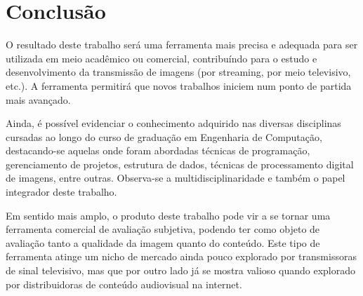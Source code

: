 \chapter{Conclusão}

O resultado deste trabalho será uma ferramenta mais precisa e adequada para ser utilizada em meio acadêmico ou comercial, contribuíndo para o estudo e desenvolvimento da transmissão de imagens (por streaming, por meio televisivo, etc.). A ferramenta permitirá que novos trabalhos iniciem num ponto de partida mais avançado. 

Ainda, é possível evidenciar o conhecimento adquirido nas diversas disciplinas cursadas ao longo do curso de graduação em Engenharia de Computação, destacando-se aquelas onde foram abordadas técnicas de programação, gerenciamento de projetos, estrutura de dados, técnicas de processamento digital de imagens, entre outras. Observa-se a multidisciplinaridade e também o papel integrador deste trabalho.

Em sentido mais amplo, o produto deste trabalho pode vir a se tornar uma ferramenta comercial de avaliação subjetiva, podendo ter como objeto de avaliação tanto a qualidade da imagem quanto do conteúdo. Este tipo de ferramenta atinge um nicho de mercado ainda pouco explorado por transmissoras de sinal televisivo, mas que por outro lado já se mostra valioso quando explorado por distribuidoras de conteúdo audiovisual na internet.

